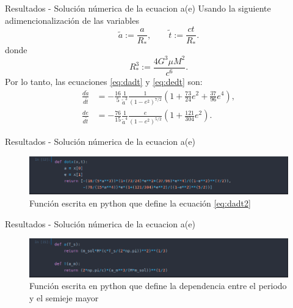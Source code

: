 \begin{frame}{Resultados - Solución númerica de la ecuacion a(e)}
    Usando la siguiente adimencionalización \cite{Vito2008,Gonzalez2018,Gonz2019} de las variables
\begin{equation*}
    \tilde{a}:= \frac{a}{R_*}, \qquad  \tilde{t}:=\frac{ct}{R_*}.
\end{equation*}
donde
\begin{equation*}
    R_*^3 := \frac{4G^3\mu M^2}{c^6}.
\end{equation*}
Por lo tanto, las ecuaciones \ref{eq:dadt} y \ref{eq:dedt} son:
\begin{align}
    \label{eq:dadt2}
    \frac{d\tilde{a}}{d\tilde{t}} &= -\frac{16}{5}\frac{1}{\tilde{a}^3}\frac{1}{\left(1-e^2\right)^{7/2}}\left(1+\frac{73}{24}e^2+\frac{37}{96}e^4\right) ,\\
    \label{eq:dedt2}
\frac{de}{d\tilde{t}} &= -\frac{76}{15}\frac{1}{\tilde{a}^4}\frac{e}{\left(1-e^2\right)^{5/2}}\left(1+\frac{121}{304}e^2\right) .
\end{align}
\end{frame}
\begin{frame}{Resultados - Solución númerica de la ecuacion a(e)}
    \begin{figure}[H]
        \includegraphics[scale=0.4]{images/dot.png}
        \caption{Función escrita en python que define la ecuación \ref{eq:dadt2} }
    \end{figure}
\end{frame}
\begin{frame}{Resultados - Solución númerica de la ecuacion a(e)}
    \begin{figure}[H]
        \includegraphics[scale=0.4]{images/fun.png}
        \caption{Función escrita en python que define la dependencia entre el periodo y el semieje mayor}
    \end{figure}
\end{frame}
